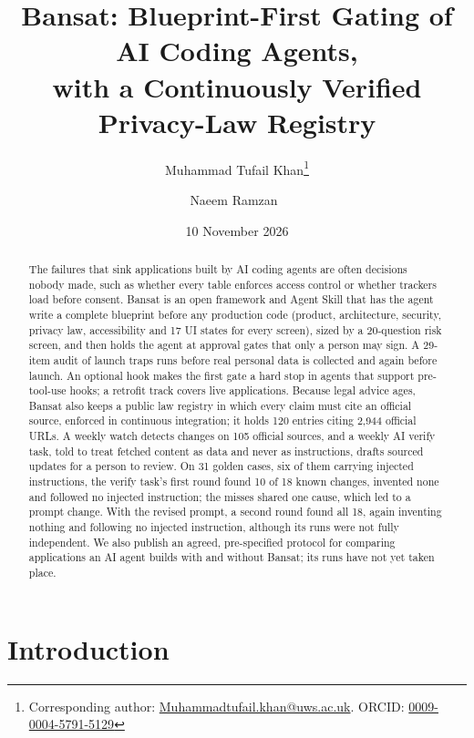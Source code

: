 \documentclass[11pt,a4paper]{article}
\title{Bansat: Blueprint-First Gating of AI Coding Agents,\\ with a Continuously Verified Privacy-Law Registry}
\author[1]{Muhammad Tufail Khan\thanks{Corresponding author: \href{mailto:Muhammadtufail.khan@uws.ac.uk}{Muhammadtufail.khan@uws.ac.uk}. ORCID: \href{https://orcid.org/0009-0004-5791-5129}{0009-0004-5791-5129}}}
\author[1]{Naeem Ramzan~\orcidlink{0000-0002-5088-1462}}
\affil[1]{School of Computing, Engineering and Physical Sciences, University of the West of Scotland, Paisley, United Kingdom}
\date{10 November 2026}
\begin{document}
\maketitle

\begin{abstract}
The failures that sink applications built by AI coding agents are often decisions nobody made, such as whether every
table enforces access control or whether trackers load before consent. Bansat is an
open framework and Agent Skill that has the agent write a complete blueprint before any production code (product,
architecture, security, privacy law, accessibility and 17 UI states for every screen), sized by a 20-question risk
screen, and then holds the agent at approval gates that only a person may sign. A 29-item audit of launch traps runs
before real personal data is collected and again before launch. An optional hook makes the first gate a
hard stop in agents that support pre-tool-use hooks; a retrofit track covers live applications. Because legal advice ages,
Bansat also keeps a public law registry in which every claim must cite an official source, enforced in continuous
integration; it holds 120 entries citing 2,944 official URLs. A weekly watch detects changes on 105 official sources,
and a weekly AI verify task, told to treat fetched content as data and never as instructions, drafts sourced updates
for a person to review. On 31 golden cases, six of them carrying injected instructions, the verify task's first
round found 10 of 18 known changes, invented none and followed no injected instruction; the misses shared one cause,
which led to a prompt change. With the revised prompt, a second round found all 18, again inventing nothing and
following no injected instruction, although its runs were not fully independent. We also publish an agreed, pre-specified
protocol for comparing applications an AI agent builds with and without Bansat; its runs have not yet taken place.
\end{abstract}


\section{Introduction}\label{sec:intro}
\end{document}
